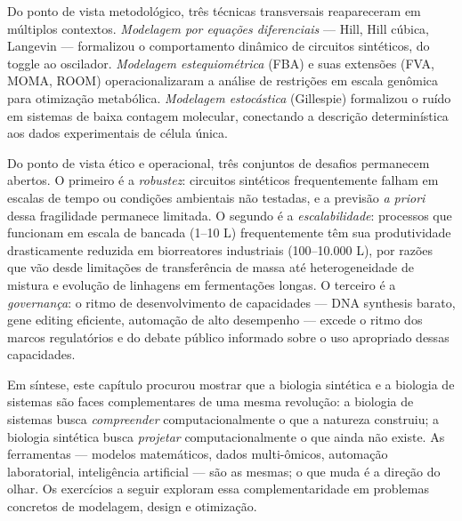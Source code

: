 Do ponto de vista metodológico, três técnicas transversais reapareceram em múltiplos contextos. \emph{Modelagem por equações diferenciais} --- Hill, Hill cúbica, Langevin --- formalizou o comportamento dinâmico de circuitos sintéticos, do toggle ao oscilador. \emph{Modelagem estequiométrica} (FBA) e suas extensões (FVA, MOMA, ROOM) operacionalizaram a análise de restrições em escala genômica para otimização metabólica. \emph{Modelagem estocástica} (Gillespie) formalizou o ruído em sistemas de baixa contagem molecular, conectando a descrição determinística aos dados experimentais de célula única.

Do ponto de vista ético e operacional, três conjuntos de desafios permanecem abertos. O primeiro é a \emph{robustez}: circuitos sintéticos frequentemente falham em escalas de tempo ou condições ambientais não testadas, e a previsão \emph{a priori} dessa fragilidade permanece limitada. O segundo é a \emph{escalabilidade}: processos que funcionam em escala de bancada (1--10 L) frequentemente têm sua produtividade drasticamente reduzida em biorreatores industriais (100--10.000 L), por razões que vão desde limitações de transferência de massa até heterogeneidade de mistura e evolução de linhagens em fermentações longas. O terceiro é a \emph{governança}: o ritmo de desenvolvimento de capacidades --- DNA synthesis barato, gene editing eficiente, automação de alto desempenho --- excede o ritmo dos marcos regulatórios e do debate público informado sobre o uso apropriado dessas capacidades.

Em síntese, este capítulo procurou mostrar que a biologia sintética e a biologia de sistemas são faces complementares de uma mesma revolução: a biologia de sistemas busca \emph{compreender} computacionalmente o que a natureza construiu; a biologia sintética busca \emph{projetar} computacionalmente o que ainda não existe. As ferramentas --- modelos matemáticos, dados multi-ômicos, automação laboratorial, inteligência artificial --- são as mesmas; o que muda é a direção do olhar. Os exercícios a seguir exploram essa complementaridade em problemas concretos de modelagem, design e otimização.

